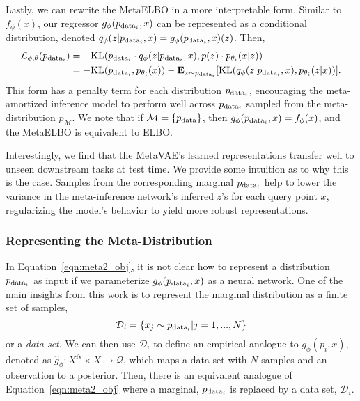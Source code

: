 Lastly, we can rewrite the MetaELBO in a more interpretable form. Similar to $f_\phi(x)$, our regressor $g_\phi(p_{\textup{data}_i}, x)$ can be represented as a conditional distribution, denoted $q_\phi(z|p_{\textup{data}_i}, x) = g_\phi(p_{\textup{data}_i}, x)(z)$.
Then,
\begin{align*}
    \mathcal{L}_{\phi, \theta}(p_{\textup{data}_i}) &= -\textup{KL}(p_{\textup{data}_i} \cdot q_\phi(z| p_{\textup{data}_i}, x),  p(z) \cdot p_{\theta_i}(x|z)) \\
    &= -\textup{KL}(p_{\textup{data}_i}, p_{\theta_i}(x))  -\mathbf{E}_{x \sim p_{\textup{data}_i}}[\textup{KL}(q_\phi(z|p_{\textup{data}_i}, x), p_{\theta_i}(z|x))].
\end{align*}
This form has a penalty term for each distribution $p_{\textup{data}_i}$, encouraging the meta-amortized inference model to perform well across $p_{\textup{data}_i}$ sampled from the meta-distribution $p_{\mathcal{M}}$. We note that if $\mathcal{M} = \{p_{\textup{data}}\}$, then $g_\phi(p_{\textup{data}_i}, x) = f_\phi(x)$, and the MetaELBO is equivalent to ELBO. 

Interestingly, we find that the MetaVAE's learned representations transfer well to unseen downstream tasks at test time. We provide some intuition as to why this is the case. Samples from the corresponding marginal $p_{\textup{data}_i}$ help to lower the variance in the meta-inference network's inferred $z$'s for each query point $x$, regularizing the model's behavior to yield more robust representations.

\subsubsection{Representing the Meta-Distribution}
In Equation~\ref{eqn:meta2_obj}, it is not clear how to represent a distribution  $p_{\textup{data}_i}$ as input if we parameterize $g_\phi(p_{\textup{data}_i}, x)$ as a neural network. One of the main insights from this work is to represent the marginal distribution as a finite set of samples, 
\begin{equation}
    \mathcal{D}_i = \{x_j \sim p_{\textup{data}_i} | j=1,...,N\}
\end{equation}
or a \textit{data set}. 
We can then use $\mathcal{D}_i$ to define an empirical analogue to $g_\phi(p_i, x)$, denoted as $\hat{g}_\phi:X^N \times X \rightarrow \mathcal{Q}$, which maps a data set with $N$ samples and an observation to a posterior. Then, there is an equivalent analogue of Equation~\ref{eqn:meta2_obj} where a marginal, $p_{\textup{data}_i}$ is replaced by a data set, $\mathcal{D}_i$. 

